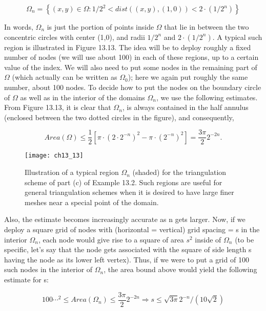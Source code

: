 \documentclass[../main.tex]{subfiles}
\begin{document}
$$
\Omega_n= \left\{(x,y) \in \Omega: 1/2^2 < dist((x,y),(1,0)) < 2 \cdot (1/2^n) \right\}
$$

In words, $\Omega_n$ is just the portion of points inside $\Omega$ that lie in between the two concentric circles with center (1,0), and radii $1/2^n$ and $2\cdot(1/2^n)$. A typical such region is illustrated in Figure 13.13. The idea will be to deploy roughly a fixed number of nodes (we will use about 100) in each of these regions, up to a certain value of the index. We will also need to put some nodes in the remaining part of $\Omega$ (which actually can be written as $\Omega_0$); here we again put roughly the same number, about 100 nodes. To decide how to put the nodes on the boundary circle of $\Omega$ as well as in the interior of the domains $\Omega_n$, we use the following estimates. From Figure 13.13, it is clear that $\Omega_n$, is always contained in the half annulus (enclosed between the two dotted circles in the figure), and consequently, 

$$
Area(\Omega)\leqslant \frac{1}{2}[\pi \cdot(2 \cdot2^{-n})^2 -\pi \cdot(2^{-n})^2]=\frac{3\pi}{2}2^{-2n}.
$$

\begin{figure}[H]
	\centering
	\texttt{[image: ch13\_13]}
	\caption{\textsf{  Illustration of a typical region $\Omega_n$ (shaded) for the triangulation scheme of part (c) of Example 13.2. Such regions are useful for general triangulation schemes when it is desired to have large finer meshes near a special point of the domain. }}
	\label{pfig:ch13_13}
\end{figure}

Also, the estimate becomes increasingly accurate as n gets larger. Now, if we deploy a square grid of nodes with (horizontal = vertical) grid spacing = s in the interior $\Omega_n$, each node would give rise to a square of area $s^2$ inside of $\Omega_n$ (to be specific, let's say that the node gets associated with the square of side length s having the node as its lower left vertex). Thus, if we were to put a grid of 100 such nodes in the interior of $\Omega_n$, the area bound above would yield the following estimate for s:

$$
100 \cdots^2 \leqslant Area(\Omega_n)\leqslant \frac{3\pi}{2}2^{-2n}\Rightarrow s \leqslant \sqrt{3\pi} 2^{-n} /(10\sqrt{2})
$$
\end{document}
